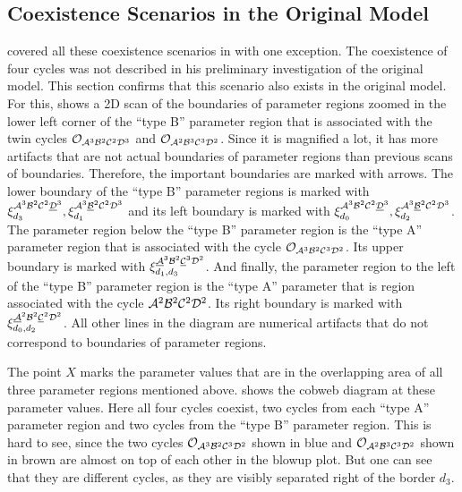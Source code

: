 \subsection{Coexistence Scenarios in the Original Model}

 covered all these coexistence scenarios in \cite{akyuz2022} with one exception.
The coexistence of four cycles was not described in his preliminary investigation of the original model.
This section confirms that this scenario also exists in the original model.
For this,  shows a 2D scan of the boundaries of parameter regions zoomed in the lower left corner of the ``type B'' parameter region that is associated with the twin cycles $\mathcal{O}_{\mathcal{A}^3\mathcal{B}^2\mathcal{C}^2\mathcal{D}^3}$ and $\mathcal{O}_{\mathcal{A}^2\mathcal{B}^3\mathcal{C}^3\mathcal{D}^2}$.
Since it is magnified a lot, it has more artifacts that are not actual boundaries of parameter regions than previous scans of boundaries.
Therefore, the important boundaries are marked with arrows.
The lower boundary of the ``type B'' parameter regions is marked with $\xi^{\mathcal{A}^3\mathcal{B}^2\mathcal{C}^2\underline{\mathcal{D}}^3}_{d_3}, \xi^{\mathcal{A}^3\underline{\mathcal{B}}^2\mathcal{C}^2\mathcal{D}^3}_{d_1}$ and its left boundary is marked with $\xi^{\mathcal{A}^3\mathcal{B}^2\mathcal{C}^2\underline{\mathcal{D}}^3}_{d_0}, \xi^{\mathcal{A}^3\underline{\mathcal{B}}^2\mathcal{C}^2\mathcal{D}^3}_{d_2}$.
The parameter region below the ``type B'' parameter region is the ``type A'' parameter region that is associated with the cycle $\mathcal{O}_{\mathcal{A}^3\mathcal{B}^2\mathcal{C}^3\mathcal{D}^2}$.
Its upper boundary is marked with $\xi^{\underline{\mathcal{A}}^3\mathcal{B}^2\underline{\mathcal{C}}^3\mathcal{D}^2}_{d_1, d_3}$.
And finally, the parameter region to the left of the ``type B'' parameter region is the ``type A'' parameter that is region associated with the cycle $\mathcal{A}^2\mathcal{B}^2\mathcal{C}^2\mathcal{D}^2$.
Its right boundary is marked with $\xi^{\underline{\mathcal{A}}^2\mathcal{B}^2\underline{\mathcal{C}}^2\mathcal{D}^2}_{d_0, d_2}$.
All other lines in the diagram are numerical artifacts that do not correspond to boundaries of parameter regions.

The point $X$ marks the parameter values that are in the overlapping area of all three parameter regions mentioned above.
 shows the cobweb diagram at these parameter values.
Here all four cycles coexist, two cycles from each ``type A'' parameter region and two cycles from the ``type B'' parameter region.
This is hard to see, since the two cycles $\mathcal{O}_{\mathcal{A}^3\mathcal{B}^2\mathcal{C}^3\mathcal{D}^2}$ shown in blue and $\mathcal{O}_{\mathcal{A}^2\mathcal{B}^3\mathcal{C}^3\mathcal{D}^2}$ shown in brown are almost on top of each other in the blowup plot.
But one can see that they are different cycles, as they are visibly separated right of the border $d_3$.

